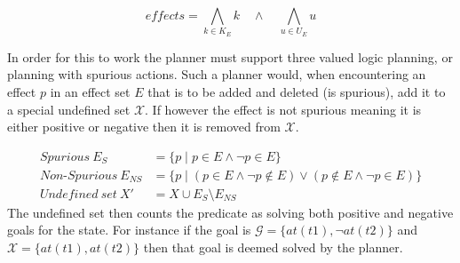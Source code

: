\documentclass[../Master.tex]{subfiles}
\begin{document}
	\begin{equation}
		effects = \bigwedge\limits_{k \in K_E} k \quad \land \quad \bigwedge\limits_{u \in U_E} u
	\end{equation}
	
	In order for this to work the planner must support three valued logic planning, or planning with spurious actions. 
	Such a planner would, when encountering an effect $p$ in an effect set $E$ that is to be added and deleted (is spurious), add it to a special undefined set $\mathcal{X}$.
	If however the effect is not spurious meaning it is either positive or negative then it is removed from $\mathcal{X}$.
	
			\begin{equation} 
				\begin{split}
					Spurious~E_S &= \{ p \mid p \in E \land \neg p \in E \} \\
					Non\text{-}Spurious~E_{NS} &= \{ p \mid (p \in E \land \neg p \notin E ) \lor (p \notin E \land \neg p \in E )  \}\\
					Undefined ~ set ~ X' &= X \cup E_S \setminus E_{NS}
				\end{split}	
			\end{equation}
	The undefined set then counts the predicate as solving both positive and negative goals for the state. 
	For instance if the goal is $\mathcal{G} = \{at(t1), \neg at(t2)\}$ and $\mathcal{X} = \{at(t1), at(t2)\}$ then that goal is deemed solved by the planner.
	
\end{document}

